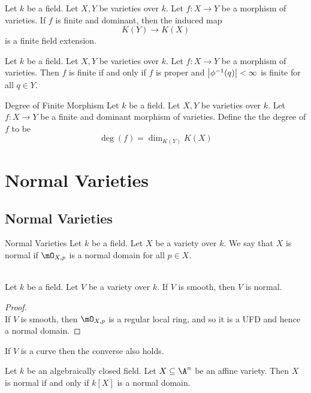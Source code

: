 \documentclass[a4paper]{article}
\begin{document}
\begin{prp}{}{} Let $k$ be a field. Let $X,Y$ be varieties over $k$. Let $f:X\to Y$ be a morphism of varieties. If $f$ is finite and dominant, then the induced map $$K(Y)\to K(X)$$ is a finite field extension. 
\end{prp}

\begin{prp}{}{} Let $k$ be a field. Let $X,Y$ be varieties over $k$. Let $f:X\to Y$ be a morphism of varieties. Then $f$ is finite if and only if $f$ is proper and $\abs{\phi^{-1}(q)}<\infty$ is finite for all $q\in Y$. 
\end{prp}

\begin{defn}{Degree of Finite Morphism}{} Let $k$ be a field. Let $X,Y$ be varieties over $k$. Let $f:X\to Y$ be a finite and dominant morphism of varieties. Define the the degree of $f$ to be $$\deg(f)=\dim_{K(Y)}K(X)$$
\end{defn}

\pagebreak
\section{Normal Varieties}
\subsection{Normal Varieties}
\begin{defn}{Normal Varieties}{} Let $k$ be a field. Let $X$ be a variety over $k$. We say that $X$ is normal if $\mO_{X,p}$ is a normal domain for all $p\in X$. 
\end{defn}

\begin{lmm}{}{}\\
Let $k$ be a field. Let $V$ be a variety over $k$. If $V$ is smooth, then $V$ is normal. 
\begin{proof}\\
If $V$ is smooth, then $\mO_{X,p}$ is a regular local ring, and so it is a UFD and hence a normal domain. 
\end{proof}
\end{lmm}

If $V$ is a curve then the converse also holds. 

\begin{prp}{}{} Let $k$ be an algebraically closed field. Let $X\subseteq\A^n$ be an affine variety. Then $X$ is normal if and only if $k[X]$ is a normal domain. 
\end{prp}
\end{document}
